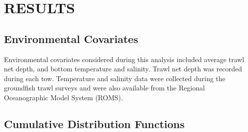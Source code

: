 \documentclass[11pt]{book}\usepackage[]{graphicx}\usepackage[]{color}
\newcommand{\latex}{\LaTeX\xspace}
\newcommand{\ShowSexpr}[1]{\texttt{{\char`\\}Sexpr\{#1\}}}
\begin{document}



\bigskip

\section{RESULTS}

\subsection{Environmental Covariates} \label{sec:enviro.covar}

Environmental covariates considered during this analysis included average trawl net depth, and bottom temperature and salinity. Trawl net depth was recorded during each tow. Temperature and salinity data were collected during the groundfish trawl surveys and were also available from the Regional Oceanographic Model System (ROMS).

\subsection{Cumulative Distribution Functions}
\end{document}
